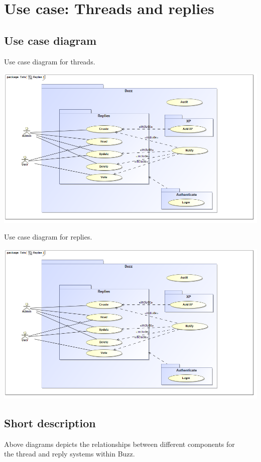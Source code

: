 \documentclass{article}
\begin{document}
\section{Use case: Threads and replies}
	\subsection{Use case diagram}
	\begin{description}
		\item[Use case diagram for threads.] 
	\end{description}
	\includegraphics[width=\textwidth]{Replies}
		\begin{description}
			\item[Use case diagram for replies.] 
		\end{description}
\includegraphics[width=\textwidth]{Replies}
	
	\subsection{Short description}
	\begin{description}
		\item[Above diagrams depicts the relationships between different components for ]
		 \item[the thread and reply systems within Buzz.] 
	\end{description}
\end{document}
